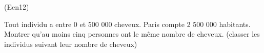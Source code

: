 \begin{tiny}(Een12)\end{tiny} Tout individu a entre 0 et 500 000 cheveux.
Paris compte 2 500 000 habitants. Montrer qu'au moins cinq personnes ont le m{\^e}me nombre de cheveux. (classer les
individus suivant leur nombre de cheveux)